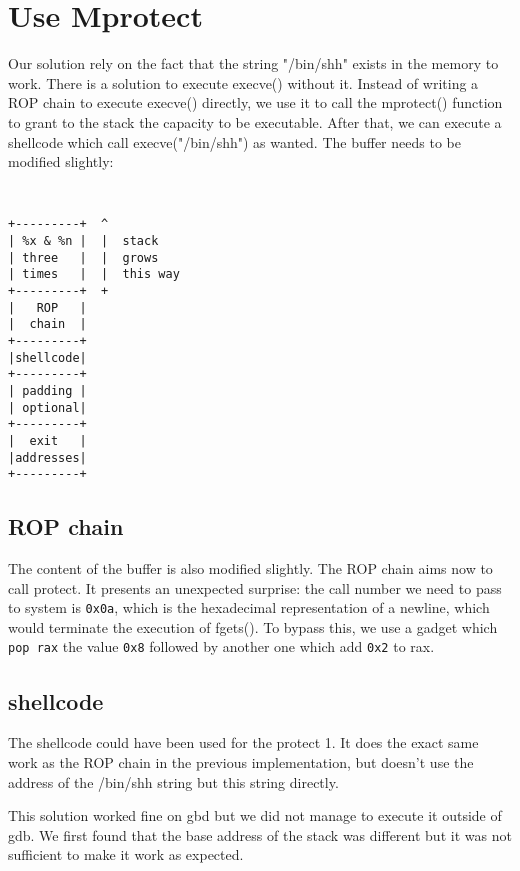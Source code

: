 \section{Use Mprotect}\label{sec:mprotectimplementation}
Our solution rely on the fact that the string "/bin/shh" exists in the memory to work. There is a solution to execute execve() without it. Instead of writing a ROP chain to execute execve() directly, we use it to call the mprotect() function to grant to the stack the capacity to be executable. After that, we can execute a shellcode which call execve("/bin/shh") as wanted.
The buffer needs to be modified slightly:
{\tt \small
\begin{verbatim}
+---------+  ^
| %x & %n |  |  stack
| three   |  |  grows
| times   |  |  this way
+---------+  +
|   ROP   |
|  chain  |
+---------+
|shellcode|
+---------+
| padding |
| optional|
+---------+
|  exit   |
|addresses|
+---------+
\end{verbatim}
}

\subsection{ROP chain}
The content of the buffer is also modified slightly.
The ROP chain aims now to call protect. It presents an unexpected surprise: the call number we need to pass to system is {\tt 0x0a}, which is the hexadecimal representation of a newline, which would terminate the execution of fgets(). To bypass this, we use a gadget which {\tt pop rax} the value {\tt 0x8} followed by another one which add {\tt 0x2} to rax.

\subsection{shellcode}
The shellcode could have been used for the protect 1. It does the exact same work as the ROP chain in the previous implementation, but doesn't use the address of the /bin/shh string but this string directly.

This solution worked fine on gbd but we did not manage to execute it outside of gdb. We first found that the base address of the stack was different but it was not sufficient to make it work as expected.
